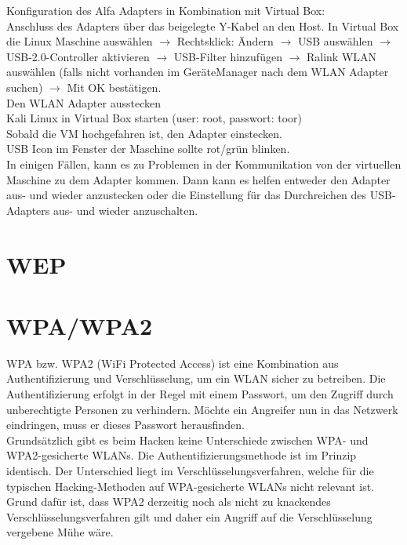 Konfiguration des Alfa Adapters in Kombination mit Virtual Box:\\

Anschluss des Adapters über das beigelegte Y-Kabel an den Host.
In Virtual Box die Linux Maschine auswählen $\rightarrow$ Rechtsklick: Ändern $\rightarrow$ USB auswählen $\rightarrow$ USB-2.0-Controller aktivieren $\rightarrow$ USB-Filter hinzufügen
$\rightarrow$ Ralink WLAN auswählen (falls nicht vorhanden im GeräteManager nach dem WLAN Adapter suchen) $\rightarrow$ Mit OK bestätigen.\\
Den WLAN Adapter ausstecken\\

Kali Linux in Virtual Box starten (user: root, passwort: toor)\\
Sobald die VM hochgefahren ist, den Adapter einstecken.\\
USB Icon im Fenster der Maschine sollte rot/grün blinken.\\ %

In einigen Fällen, kann es zu Problemen in der Kommunikation von der virtuellen Maschine zu dem Adapter kommen. 
Dann kann es helfen entweder den Adapter aus- und wieder anzustecken oder die Einstellung für das Durchreichen des USB-Adapters aus- und wieder anzuschalten.


\section{WEP}

\section{WPA/WPA2}


WPA bzw. WPA2 (WiFi Protected Access) ist eine Kombination aus Authentifizierung und Verschlüsselung, um ein WLAN sicher zu betreiben. Die Authentifizierung erfolgt in der Regel mit einem Passwort, um den Zugriff durch unberechtigte Personen zu verhindern. Möchte ein Angreifer nun in das Netzwerk eindringen, muss er dieses Passwort herausfinden.\\


Grundsätzlich gibt es beim Hacken keine Unterschiede zwischen WPA- und WPA2-gesicherte WLANs. Die Authentifizierungsmethode ist im Prinzip identisch. Der Unterschied liegt im Verschlüsselungsverfahren, welche für die typischen Hacking-Methoden auf WPA-gesicherte WLANs nicht relevant ist.\\ Grund dafür ist, dass WPA2 derzeitig noch als nicht zu knackendes Verschlüsselungsverfahren
gilt und daher ein Angriff auf die Verschlüsselung vergebene Mühe wäre. \\

